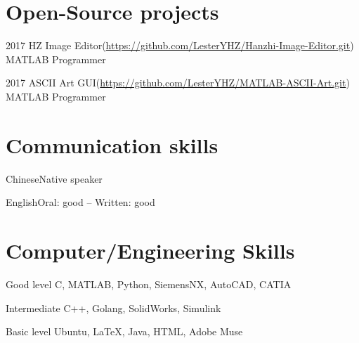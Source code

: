\documentclass{tccv}
\begin{document}
\section{Open-Source projects}

\begin{yearlist}

\item{2017}
     {HZ Image Editor\newline (\href{https://github.com/LesterYHZ/Hanzhi-Image-Editor.git}{https://github.com/LesterYHZ/Hanzhi-Image-Editor.git})}
     {MATLAB Programmer}

\item{2017}
     {ASCII Art GUI\newline (\href{https://github.com/LesterYHZ/MATLAB-ASCII-Art.git}{https://github.com/LesterYHZ/MATLAB-ASCII-Art.git})}
     {MATLAB Programmer}


\end{yearlist}

\section{Communication skills}

\begin{factlist}
\item{Chinese}{Native speaker}
\item{English}{Oral: good -- Written: good}
\end{factlist}

\section{Computer/Engineering Skills}

\begin{factlist}

\item{Good level}
     {C, MATLAB, Python, SiemensNX, AutoCAD, CATIA }

\item{Intermediate}
     {C++, Golang, SolidWorks, Simulink}

\item{Basic level}
     {Ubuntu, \LaTeX, Java, HTML, Adobe Muse}

\end{factlist}



%
%
\end{document}
